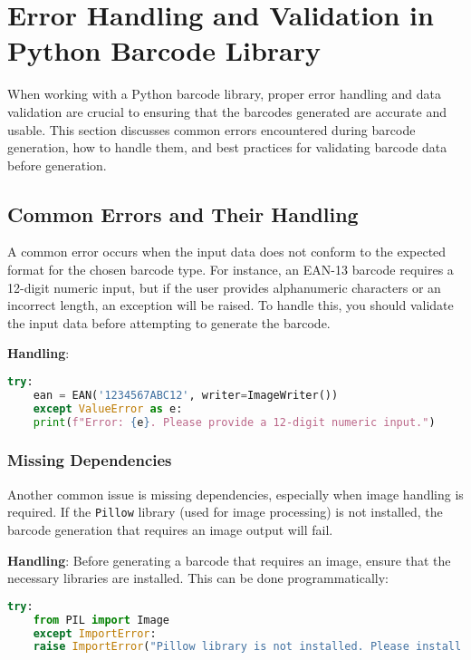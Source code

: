 \section{Error Handling and Validation in Python Barcode Library}

When working with a Python barcode library, proper error handling and data validation are crucial to ensuring that the barcodes generated are accurate and usable. This section discusses common errors encountered during barcode generation, how to handle them, and best practices for validating barcode data before generation.

\subsection{Common Errors and Their Handling}


A common error occurs when the input data does not conform to the expected format for the chosen barcode type. For instance, an EAN-13 barcode requires a 12-digit numeric input, but if the user provides alphanumeric characters or an incorrect length, an exception will be raised. To handle this, you should validate the input data before attempting to generate the barcode.

\textbf{Handling}:
\begin{lstlisting}[language=Python]
	try:
	ean = EAN('1234567ABC12', writer=ImageWriter())
	except ValueError as e:
	print(f"Error: {e}. Please provide a 12-digit numeric input.")
\end{lstlisting}



\subsubsection{Missing Dependencies}
Another common issue is missing dependencies, especially when image handling is required. If the \texttt{Pillow} library (used for image processing) is not installed, the barcode generation that requires an image output will fail.

\textbf{Handling}:
Before generating a barcode that requires an image, ensure that the necessary libraries are installed. This can be done programmatically:
\begin{lstlisting}[language=Python]
	try:
	from PIL import Image
	except ImportError:
	raise ImportError("Pillow library is not installed. Please install it using `pip install pillow`.")
\end{lstlisting}



